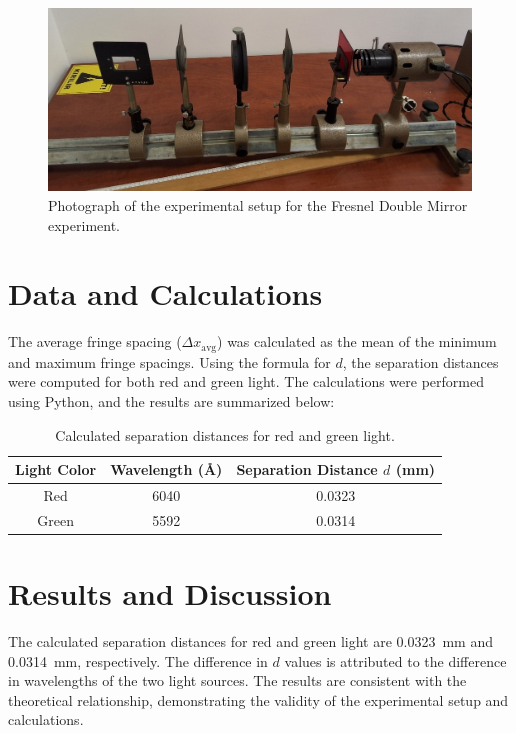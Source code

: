 \documentclass[journal]{IEEEtran}
\begin{document}
\begin{figure}[H]
    \centering
    \includegraphics[width=0.8\linewidth]{../IMAGES/setup.jpg}
    \caption{Photograph of the experimental setup for the Fresnel Double Mirror experiment.}
    \label{fig:setup_photo}
\end{figure}

\section{Data and Calculations}
The average fringe spacing ($\Delta x_{\text{avg}}$) was calculated as the mean of the minimum and maximum fringe spacings. Using the formula for $d$, the separation distances were computed for both red and green light. The calculations were performed using Python, and the results are summarized below:
\begin{table}[H]
    \centering
    \caption{Calculated separation distances for red and green light.}
    \label{tab:separation_distances}
    \begin{tabular}{@{}ccc@{}}
        \toprule
        \textbf{Light Color} & \textbf{Wavelength (\si{\angstrom})} & \textbf{Separation Distance $d$ (\si{\milli\meter})} \\ \midrule
        Red                  & 6040                                & 0.0323                                             \\
        Green                & 5592                                & 0.0314                                             \\ \bottomrule
    \end{tabular}
\end{table}
\section{Results and Discussion}

The calculated separation distances for red and green light are \SI{0.0323}{\milli\meter} and \SI{0.0314}{\milli\meter}, respectively. The difference in $d$ values is attributed to the difference in wavelengths of the two light sources. The results are consistent with the theoretical relationship, demonstrating the validity of the experimental setup and calculations.
\end{document}
